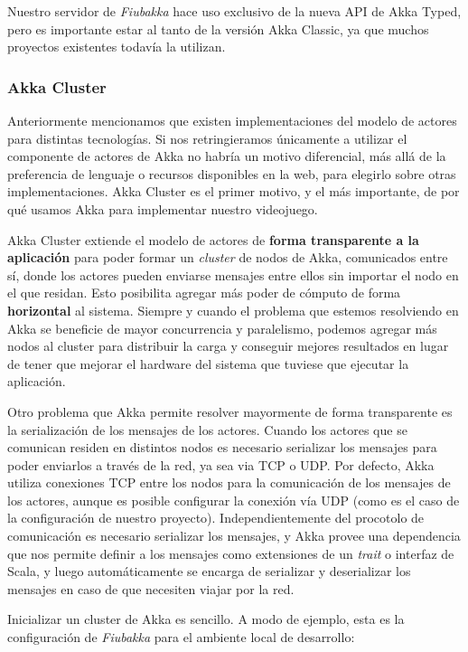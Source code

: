 Nuestro servidor de \textit{Fiubakka} hace uso exclusivo de la nueva API de Akka Typed, pero es importante estar al tanto
de la versión Akka Classic, ya que muchos proyectos existentes todavía la utilizan.

\subsubsection{Akka Cluster}

\noindent Anteriormente mencionamos que existen implementaciones del modelo de actores para distintas tecnologías. Si nos retringieramos
únicamente a utilizar el componente de actores de Akka no habría un motivo diferencial, más allá de la preferencia de lenguaje
o recursos disponibles en la web, para elegirlo sobre otras implementaciones. Akka Cluster es el primer motivo, y el más importante,
de por qué usamos Akka para implementar nuestro videojuego.

Akka Cluster extiende el modelo de actores de \textbf{forma transparente a la aplicación} para poder formar un \textit{cluster} de nodos de Akka,
comunicados entre sí, donde los actores pueden enviarse mensajes entre ellos sin importar el nodo en el que residan. Esto posibilita agregar
más poder de cómputo de forma \textbf{horizontal} al sistema. Siempre y cuando el problema que estemos resolviendo en Akka se beneficie de mayor
concurrencia y paralelismo, podemos agregar más nodos al cluster para distribuir la carga y conseguir mejores resultados en lugar
de tener que mejorar el hardware del sistema que tuviese que ejecutar la aplicación.

Otro problema que Akka permite resolver mayormente de forma transparente es la serialización de los mensajes de los actores. Cuando los actores que se comunican
residen en distintos nodos es necesario serializar los mensajes para poder enviarlos a través de la red, ya sea via TCP o UDP. Por defecto, Akka utiliza conexiones
TCP entre los nodos para la comunicación de los mensajes de los actores, aunque es posible configurar la conexión vía UDP (como es el caso de la configuración de nuestro proyecto).
Independientemente del procotolo de comunicación es necesario serializar los mensajes, y Akka provee una dependencia que nos permite definir a los mensajes como extensiones
de un \textit{trait} o interfaz de Scala, y luego automáticamente se encarga de serializar y deserializar los mensajes en caso de que necesiten viajar por la red.

Inicializar un cluster de Akka es sencillo. A modo de ejemplo, esta es la configuración de \textit{Fiubakka}
para el ambiente local de desarrollo:

